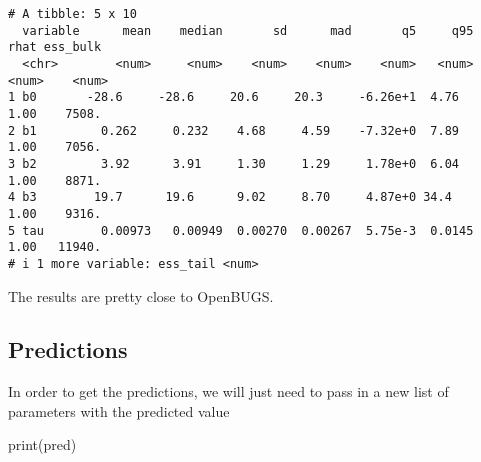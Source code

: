 \documentclass[
  letterpaper,
  DIV=11,
  numbers=noendperiod]{scrreprt}
\newenvironment{Shaded}{\begin{snugshade}}{\end{snugshade}}
\newcommand{\AttributeTok}[1]{\textcolor[rgb]{0.40,0.45,0.13}{#1}}
\newcommand{\CommentTok}[1]{\textcolor[rgb]{0.37,0.37,0.37}{#1}}
\newcommand{\DecValTok}[1]{\textcolor[rgb]{0.68,0.00,0.00}{#1}}
\newcommand{\FloatTok}[1]{\textcolor[rgb]{0.68,0.00,0.00}{#1}}
\newcommand{\FunctionTok}[1]{\textcolor[rgb]{0.28,0.35,0.67}{#1}}
\newcommand{\NormalTok}[1]{\textcolor[rgb]{0.00,0.23,0.31}{#1}}
\newcommand{\OtherTok}[1]{\textcolor[rgb]{0.00,0.23,0.31}{#1}}
\newcommand{\SpecialCharTok}[1]{\textcolor[rgb]{0.37,0.37,0.37}{#1}}
\begin{document}
\begin{verbatim}
# A tibble: 5 x 10
  variable      mean    median       sd      mad       q5     q95  rhat ess_bulk
  <chr>        <num>     <num>    <num>    <num>    <num>   <num> <num>    <num>
1 b0       -28.6     -28.6     20.6     20.3     -6.26e+1  4.76    1.00    7508.
2 b1         0.262     0.232    4.68     4.59    -7.32e+0  7.89    1.00    7056.
3 b2         3.92      3.91     1.30     1.29     1.78e+0  6.04    1.00    8871.
4 b3        19.7      19.6      9.02     8.70     4.87e+0 34.4     1.00    9316.
5 tau        0.00973   0.00949  0.00270  0.00267  5.75e-3  0.0145  1.00   11940.
# i 1 more variable: ess_tail <num>
\end{verbatim}

The results are pretty close to OpenBUGS.

\hypertarget{predictions}{%
\subsection*{Predictions}\label{predictions}}

In order to get the predictions, we will just need to pass in a new list
of parameters with the predicted value

\begin{Shaded}
\end{Shaded}

\begin{Shaded}
\begin{Highlighting}[]
\FunctionTok{print}\NormalTok{(pred)}
\end{Highlighting}
\end{Shaded}
\end{document}
